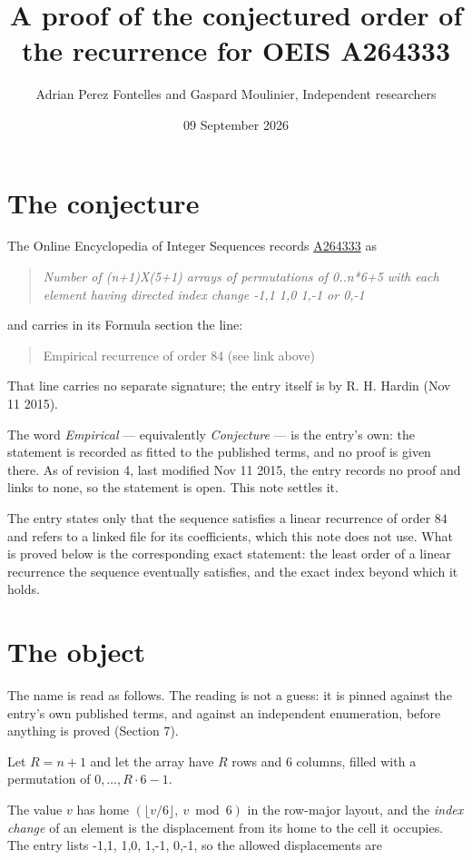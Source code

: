 \documentclass[11pt]{article}
\title{A proof of the conjectured order of the recurrence for OEIS A264333}
\author{Adrian Perez Fontelles and Gaspard Moulinier, Independent researchers}
\date{09 September 2026}
\theoremstyle{definition}
\begin{document}
\maketitle
\section{The conjecture}

The Online Encyclopedia of Integer Sequences records \href{https://oeis.org/A264333}{A264333} as

\begin{quote}\itshape Number of (n+1)X(5+1) arrays of permutations of 0..n*6+5 with each element having directed index change -1,1 1,0 1,-1 or 0,-1\end{quote}

and carries in its Formula section the line:

\begin{quote}\ttfamily Empirical recurrence of order 84 (see link above)\end{quote}

That line carries no separate signature; the entry itself is by R. H. Hardin (Nov 11 2015).

The word {\itshape Empirical} --- equivalently {\itshape Conjecture} --- is the entry's own: the statement is recorded as fitted to the published terms, and no proof is given there. As of revision 4, last modified Nov 11 2015, the entry records no proof and links to none, so the statement is open. This note settles it.

The entry states only that the sequence satisfies a linear recurrence of order $84$ and refers to a linked file for its coefficients, which this note does not use. What is proved below is the corresponding exact statement: the least order of a linear recurrence the sequence eventually satisfies, and the exact index beyond which it holds.

\section{The object}

The name is read as follows. The reading is not a guess: it is pinned against the entry's own published terms, and against an independent enumeration, before anything is proved (Section 7).

Let $R = n + 1$ and let the array have $R$ rows and $6$ columns, filled with a permutation of $0,\dots,R\cdot6-1$.

The value $v$ has home $(\lfloor v/6\rfloor,\ v \bmod 6)$ in the row-major layout, and the {\itshape index change} of an element is the displacement from its home to the cell it occupies. The entry lists -1,1, 1,0, 1,-1, 0,-1, so the allowed displacements are
\end{document}
